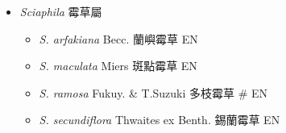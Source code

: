 
  \begin{itemize}
 \item[] \textit{Sciaphila} 霉草屬
                                
  \begin{itemize}
        \item[] \textit{S. arfakiana} Becc.  蘭嶼霉草   EN
        \item[] \textit{S. maculata} Miers  斑點霉草   EN
        \item[] \textit{S. ramosa} Fukuy. \& T.Suzuki  多枝霉草  \# EN
        \item[] \textit{S. secundiflora} Thwaites ex Benth.  錫蘭霉草   EN
  \end{itemize}
  \end{itemize}
